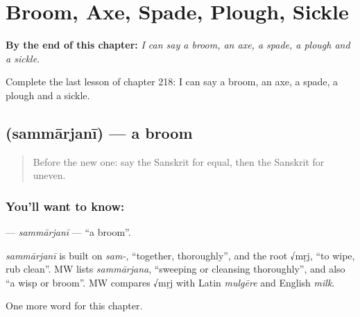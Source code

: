 
\chapter{Broom, Axe, Spade, Plough, Sickle}
\label{ch:sa-broom-axe-spade-plough-sickle}

\begin{chapteropening}
\textbf{By the end of this chapter:} \emph{I can say a broom, an axe, a spade, a plough and a sickle.}

Complete the last lesson of chapter 218: I can say a broom, an axe, a spade, a plough and a sickle.
\end{chapteropening}

\section[\texorpdfstring{\sk{सम्मार्जनी} (sammārjanī)}{सम्मार्जनी (sammārjanī)}]{ (sammārjanī) — a broom}

\label{lesson:SA-C218-sammarjani}



\begin{quote}
Before the new one: say the Sanskrit for equal, then the Sanskrit for uneven.
\end{quote}

\subsection*{You'll want to know: }
\textbf{} — \emph{sammārjanī} — \textquotedblleft{}a broom\textquotedblright{}.

\begin{cousinweb}
\emph{sammārjanī} is built on \emph{sam-}, \textquotedblleft{}together, thoroughly\textquotedblright{}, and the root √mṛj, \textquotedblleft{}to wipe, rub clean\textquotedblright{}. MW lists \emph{sammārjana}, \textquotedblleft{}sweeping or cleansing thoroughly\textquotedblright{}, and also \textquotedblleft{}a wisp or broom\textquotedblright{}. MW compares √mṛj with Latin \emph{mulgēre} and English \emph{milk}.
\end{cousinweb}

\begin{grammarlens}[title={What you've built}]
One more word for this chapter.
\end{grammarlens}


